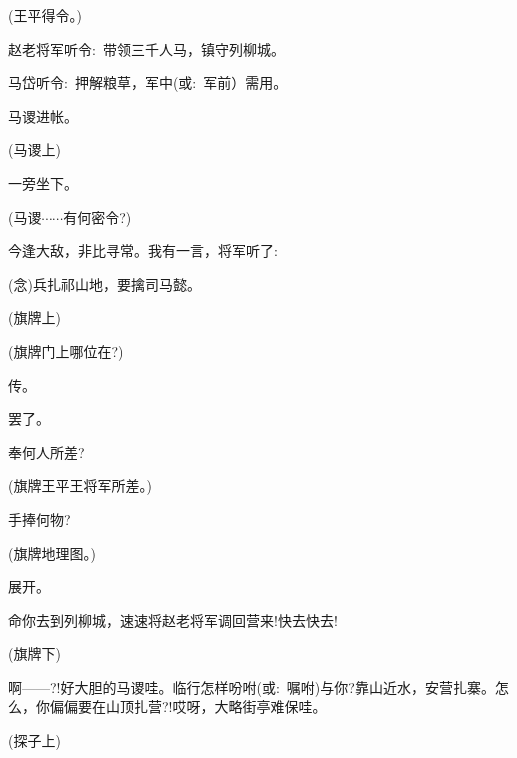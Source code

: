 {(王平\hspace{30pt}得令。)

赵老将军听令:~带领三千人马，镇守列柳城。

马岱听令:~押解粮草，军中({\akai 或}:~军前）需用。

马谡进帐。

(马谡{\hwfs 上})

一旁坐下。

(马谡\hspace{30pt}$\cdots{}\cdots{}$有何密令?)

今逢大敌，非比寻常。我有一言，将军听了:~




\vspace{5pt}

({\akai 念})兵扎祁山地，要擒司马懿。

(旗牌{\hwfs 上})

(旗牌\hspace{30pt}门上哪位在?)

传。

罢了。

奉何人所差?

(旗牌\hspace{30pt}王平王将军所差。)

手捧何物?

(旗牌\hspace{30pt}地理图。)

展开。

命你去到列柳城，速速将赵老将军调回营来!快去快去!

(旗牌{\hwfs 下})

啊------?!好大胆的马谡哇。临行怎样吩咐({\akai 或}:~嘱咐)与你?靠山近水，安营扎寨。怎么，你偏偏要在山顶扎营?!哎呀，大略街亭难保哇。

(探子{\hwfs 上})

}
